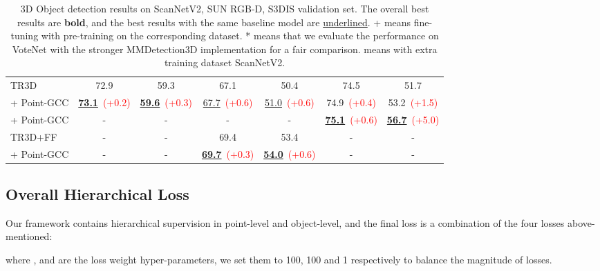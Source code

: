 \documentclass{article}
\begin{document}
\begin{table}
{\begin{tabular}{lcccccc}
    \midrule
    TR3D~\cite{TR3D} & 72.9 & 59.3 & 67.1 & 50.4 & 74.5 & 51.7 \\
    \rowcolor{linecolor2}+ Point-GCC & \textbf{\underline{73.1}}~\tiny{\textcolor{red}{(+0.2)}} & \textbf{\underline{59.6}}~\tiny{\textcolor{red}{(+0.3)}} & \underline{67.7}~\tiny{\textcolor{red}{(+0.6)}} & \underline{51.0}~\tiny{\textcolor{red}{(+0.6)}} & 74.9~\tiny{\textcolor{red}{(+0.4)}} & 53.2~\tiny{\textcolor{red}{(+1.5)}} \\
    \rowcolor{linecolor}+ Point-GCC & - & - & - & - & \textbf{\underline{75.1}}~\tiny{\textcolor{red}{(+0.6)}} & \textbf{\underline{56.7}}~\tiny{\textcolor{red}{(+5.0)}} \\
    \midrule
    TR3D+FF~\cite{TR3D} & - & - & 69.4 & 53.4 & - & - \\
    \rowcolor{linecolor2}+ Point-GCC & - & - & \textbf{\underline{69.7}}~\tiny{\textcolor{red}{(+0.3)}} & \textbf{\underline{54.0}}~\tiny{\textcolor{red}{(+0.6)}} & - & - \\
    \bottomrule
  \end{tabular}
\vspace{-2cm}
}
\caption{3D Object detection results on ScanNetV2, SUN RGB-D, S3DIS validation set. The overall best results are \textbf{bold}, and the best results with the same baseline model are \underline{underlined}. + means fine-tuning with pre-training on the corresponding dataset. * means that we evaluate the performance on VoteNet with the stronger MMDetection3D implementation for a fair comparison.  means with extra training dataset ScanNetV2.}
\label{detection-table}
\vspace{-5pt}
\end{table}

\subsection{Overall Hierarchical Loss}
\label{sec:overall}
\vspace{-0.25cm}
Our framework contains hierarchical supervision in point-level and object-level, and the ﬁnal loss is a combination of the four losses above-mentioned:

where ,  and  are the loss weight hyper-parameters, we set them to 100, 100 and 1 respectively to balance the magnitude of losses.
\end{document}
